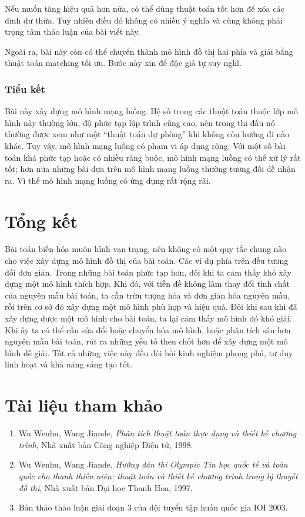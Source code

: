 \documentclass[11pt]{article}
\begin{document}
Nếu muốn tăng hiệu quả hơn nữa, có thể dùng thuật toán tốt hơn để xóa các
đỉnh dư thừa. Tuy nhiên điều đó không có nhiều ý nghĩa và cũng không phải
trọng tâm thảo luận của bài viết này.

Ngoài ra, bài này còn có thể chuyển thành mô hình đồ thị hai phía và giải
bằng thuật toán matching tối ưu. Bước này xin để độc giả tự suy nghĩ.

\subsubsection*{Tiểu kết}

Bài này xây dựng mô hình mạng luồng. Hệ số trong các thuật toán thuộc lớp mô
hình này thường lớn, độ phức tạp lập trình cũng cao, nên trong thi đấu nó
thường được xem như một ``thuật toán dự phòng'' khi không còn hướng đi nào
khác. Tuy vậy, mô hình mạng luồng có phạm vi áp dụng rộng. Với một số bài
toán khá phức tạp hoặc có nhiều ràng buộc, mô hình mạng luồng có thể xử lý
rất tốt; hơn nữa những bài dựa trên mô hình mạng luồng thường tương đối dễ
nhận ra. Vì thế mô hình mạng luồng có ứng dụng rất rộng rãi.

\section{Tổng kết}

Bài toán biến hóa muôn hình vạn trạng, nên không có một quy tắc chung nào cho
việc xây dựng mô hình đồ thị của bài toán. Các ví dụ phía trên đều tương đối
đơn giản. Trong những bài toán phức tạp hơn, đôi khi ta cảm thấy khó xây dựng
một mô hình thích hợp. Khi đó, với tiền đề không làm thay đổi tính chất của
nguyên mẫu bài toán, ta cần trừu tượng hóa và đơn giản hóa nguyên mẫu, rồi
trên cơ sở đó xây dựng một mô hình phù hợp và hiệu quả. Đôi khi sau khi đã
xây dựng được một mô hình cho bài toán, ta lại cảm thấy mô hình đó khó giải.
Khi ấy ta có thể cần sửa đổi hoặc chuyển hóa mô hình, hoặc phân tích sâu hơn
nguyên mẫu bài toán, rút ra những yếu tố then chốt hơn để xây dựng một mô hình
dễ giải. Tất cả những việc này đều đòi hỏi kinh nghiệm phong phú, tư duy linh
hoạt và khả năng sáng tạo tốt.

\section*{Tài liệu tham khảo}

\begin{enumerate}
  \item Wu Wenhu, Wang Jiande, \emph{Phân tích thuật toán thực dụng và thiết
  kế chương trình}, Nhà xuất bản Công nghiệp Điện tử, 1998.
  \item Wu Wenhu, Wang Jiande, \emph{Hướng dẫn thi Olympic Tin học quốc tế và
  toàn quốc cho thanh thiếu niên: thuật toán và thiết kế chương trình trong lý
  thuyết đồ thị}, Nhà xuất bản Đại học Thanh Hoa, 1997.
  \item Bản thảo thảo luận giai đoạn 3 của đội tuyển tập huấn quốc gia IOI
  2003.
\end{enumerate}
\end{document}
